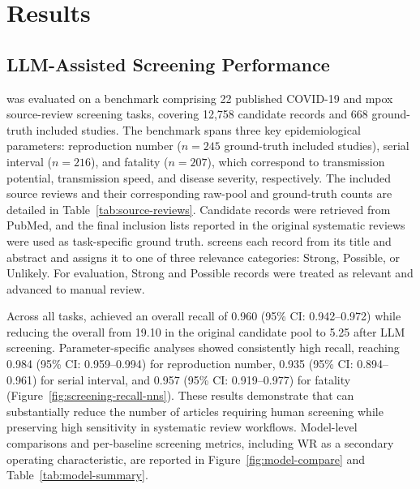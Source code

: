 \section{Results}

\subsection{LLM-Assisted Screening Performance}

\metagent{} was evaluated on a benchmark comprising 22 published COVID-19 and mpox source-review screening tasks, covering 12,758 candidate records and 668 ground-truth included studies. The benchmark spans three key epidemiological parameters: reproduction number ($n=245$ ground-truth included studies), serial interval ($n=216$), and fatality ($n=207$), which correspond to transmission potential, transmission speed, and disease severity, respectively. The included source reviews and their corresponding raw-pool and ground-truth counts are detailed in Table~\ref{tab:source-reviews}. Candidate records were retrieved from PubMed, and the final inclusion lists reported in the original systematic reviews were used as task-specific ground truth. \metagent{} screens each record from its title and abstract and assigns it to one of three relevance categories: Strong, Possible, or Unlikely. For evaluation, Strong and Possible records were treated as relevant and advanced to manual review.

Across all tasks, \metagent{} achieved an overall recall of 0.960 (95\% CI: 0.942--0.972) while reducing the overall \nns{} from 19.10 in the original candidate pool to 5.25 after LLM screening. Parameter-specific analyses showed consistently high recall, reaching 0.984 (95\% CI: 0.959--0.994) for reproduction number, 0.935 (95\% CI: 0.894--0.961) for serial interval, and 0.957 (95\% CI: 0.919--0.977) for fatality (Figure~\ref{fig:screening-recall-nns}). These results demonstrate that \metagent{} can substantially reduce the number of articles requiring human screening while preserving high sensitivity in systematic review workflows. Model-level comparisons and per-baseline screening metrics, including WR as a secondary operating characteristic, are reported in Figure~\ref{fig:model-compare} and Table~\ref{tab:model-summary}.

